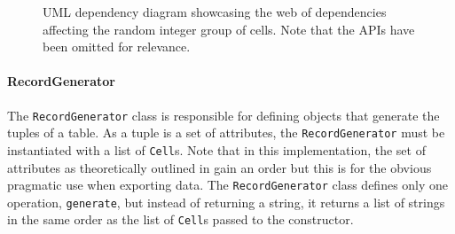 \begin{figure}[t]
    \caption{UML dependency diagram showcasing the web of dependencies affecting
    the random integer group of cells. Note that the APIs have been omitted for
relevance.}
    \label{fig:project:benchmark:random-integer-cell-dependencies}
\end{figure}

\paragraph{RecordGenerator} The \lstinline{RecordGenerator} class is
responsible for defining objects that generate the tuples of a table. As a tuple
is a set of attributes, the \lstinline{RecordGenerator} must be instantiated
with a list of \lstinline{Cell}s. Note that in this implementation, the set of
attributes as theoretically outlined in  gain an
order but this is for the obvious pragmatic use when exporting data. The
\lstinline{RecordGenerator} class defines only one operation,
\lstinline{generate}, but instead of returning a string, it returns a list of
strings in the same order as the list of \lstinline{Cell}s passed to the
constructor.

